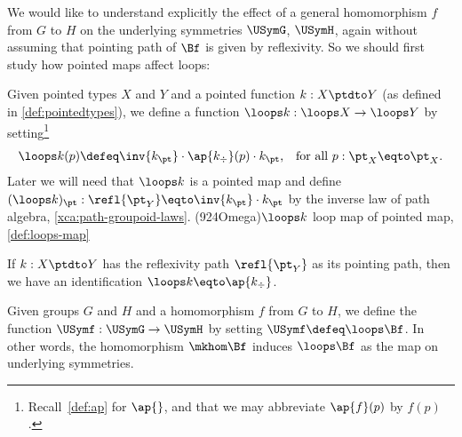 We would like to understand explicitly the effect of a general homomorphism $f$ from $G$ to $H$
on the underlying symmetries $\USymG$, $\USymH$,
again without assuming that pointing path of $\Bf$ is given by
reflexivity.
So we should first study how pointed maps affect loops:

\begin{definition}\label{def:loops-map}
  Given pointed types $X$ and $Y$ and a pointed function $k : X\ptdto Y$ (as defined in \cref{def:pointedtypes}),
  we define a function $\loops k : \loops X \to \loops Y$ by setting\footnote{%
    Recall~\cref{def:ap} for $\ap{}$, and that we may abbreviate
    $\ap{f}(p)$ by $f(p)$.}
  \[
    \loops k(p) \defeq \inv{k_\pt} \cdot \ap{k_\div}(p) \cdot k_\pt
    \text{,\quad for all $p: \pt_X \eqto \pt_X$.}
  \]
  Later we will need that $\loops k$ is a pointed map and define 
  $(\loops k)_\pt: \refl{\pt_Y}\eqto \inv{k_\pt}\cdot k_\pt$ by
  the inverse law of path algebra, \cref{xca:path-groupoid-laws}.
  \glossary(924Omega){$\protect\loops k$}%
  {loop map of pointed map, \cref{def:loops-map}}
\end{definition}

\begin{remark}\label{rem:loops-map}
  If $k : X \ptdto Y$ has the reflexivity path $\refl{\pt_Y}$ as its
  pointing path, then we have an identification $\loops k \eqto \ap{k_\div}$.
\end{remark}

\begin{definition}\label{def:USym-hom}
  Given groups $G$ and $H$ and a homomorphism  $f$ from $G$ to $H$, 
  we define the function $\USymf : \USymG \to \USymH$
  by setting $\USymf \defeq \loops \Bf$.
  In other words, the homomorphism $\mkhom\Bf$
  induces $\loops\Bf$ as the map on underlying symmetries.
\end{definition}

